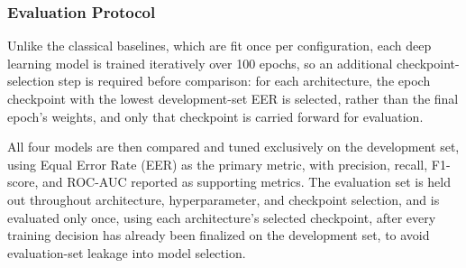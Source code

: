 \subsubsection{Evaluation Protocol}

Unlike the classical baselines, which are fit once per configuration, each deep learning model is trained iteratively over 100 epochs, so an additional checkpoint-selection step is required before comparison: for each architecture, the epoch checkpoint with the lowest development-set EER is selected, rather than the final epoch's weights, and only that checkpoint is carried forward for evaluation.

All four models are then compared and tuned exclusively on the development set, using Equal Error Rate (EER) as the primary metric, with precision, recall, F1-score, and ROC-AUC reported as supporting metrics. The evaluation set is held out throughout architecture, hyperparameter, and checkpoint selection, and is evaluated only once, using each architecture's selected checkpoint, after every training decision has already been finalized on the development set, to avoid evaluation-set leakage into model selection.
